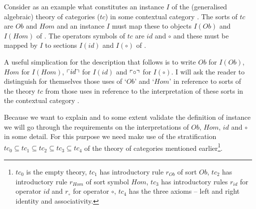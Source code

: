 

\newcommand{\sect}{Sect}
\newcommand{\insect}[2]{#1 \in Sect(#2)}

\newcommand {\OO}{Ob^2}
\newcommand {\OOO}{Ob^3}
\newcommand {\OOOO}{Ob^4}
\newcommand{\HomOb}{\crossx{Hom}{Ob}{1}}
\newcommand{\fid}{\qq{id}}
\newcommand{\fcomp}{\qq{\circ}}

\newcommand{\leftidentitylhsterm}{({x_1}^*\qq{id})^*\tuple{x_1,x_1,x_2}^*\fcomp}
\newcommand{\rightidentitylhsterm}{({x_2}^*\qq{id})^*\tuple{x_1,x_2,x_2}^*\fcomp}
\newcommand{\HomHom}{\crossx{Hom}{Hom}{\OO}}

\newcommand {\yOOO}{\ofT{y_1,y_2,y_3}{Ob}}
\newcommand {\yOOOfH}{\yOOO,\,\ofT{f}{Hom(y_1,y_2)}}
\newcommand{\yOOOfHgH}{\yOOOfH,\,\ofT{g}{Hom(y_2,y_3)}}

\newcommand {\yOOOfHmapped}{\tuple{y_1,y_2}^*Hom}
\newcommand {\yOOOfHgHmapped}{\crossx{\yOOOfHmapped}{\tuple{y_2,y_3}^*Hom}{\OOO}}
\newcommand {\yOOOfHgHHmapped}{\crossx{\big(\yOOOfHgHmapped\big)}{{\tuple{y_1,y_3}^*Hom}}{\OOO}}

\iffalse

\note
Consider as an example
what constitutes an instance $I$ of the (generalised algebraic) theory of categories ($tc$) in some 
 contextual category \catc.
The sorts of $tc$ are $Ob$ and $Hom$ 
and an instance $I$ must map these to objects $I(Ob)$ and  $I(Hom)$ of \catc.
The operators symbols of
$tc$ are  $id$ and $\circ$ and these must be mapped by $I$ to sections $I(id)$ and $I(\circ)$ of \catc.

A useful simplication for the description that follows is to write $Ob$ for $I(Ob)$, $Hom$ for $I(Hom)$, $\left\ulcorner id\right\urcorner$ for $I(id)$ and   $\left\ulcorner\circ\right\urcorner$ for $I(\circ)$.   I will ask the reader  to distinguish for themselves 
those uses of `$Ob$' and `$Hom$' in reference to sorts of the theory $tc$ from those uses in reference to the interpretation of these sorts in the contextual category \catc. 

Because we want to explain and to some extent validate the definition of instance we will go through the
requirements on the interpretations of $Ob$, $Hom$, $id$ and $\circ$ in some detail.  For this purpose we
need make use of the stratification 
$tc_0 \subseteq tc_1 \subseteq tc_2 \subseteq tc_3 \subseteq tc_4$
of the theory of categories mentioned earlier\footnote{$tc_0$ is the empty theory, $tc_1$ has introductory rule 
$r_{Ob}$ of sort $Ob$, $tc_2$ has introductory rule $r_{Hom}$ of sort symbol $Hom$, $tc_3$ has introductory rules
$r_{id}$ for operator $id$ and  $r_\circ$ for operator $\circ$, $tc_4$ has the three axioms -- left and right identity and associativity.}.


